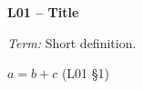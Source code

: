 \documentclass{article}
\newcommand{\lecture}[2]{\par\smallskip\textbf{#1 -- #2}\par}
\newcommand{\defn}[2]{\par\textit{#1:} #2\par}
\begin{document}
\fontsize{\sheetfontsize}{\sheetleading}\selectfont
\setlength{\abovedisplayskip}{1pt}
\setlength{\belowdisplayskip}{1pt}
\setlength{\abovedisplayshortskip}{0pt}
\setlength{\belowdisplayshortskip}{0pt}
\begin{multicols*}{\sheetcolumns}
\lecture{L01}{Title}
\defn{Term}{Short definition.}
$a = b + c$ \quad (L01 §1)
\end{multicols*}
\end{document}
